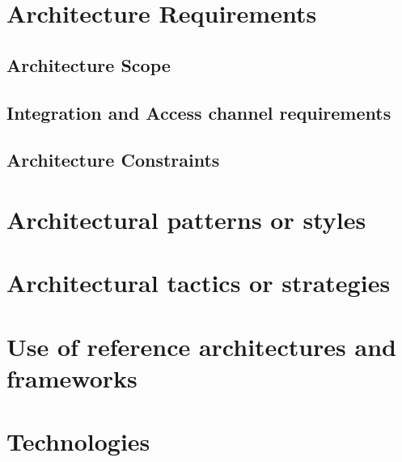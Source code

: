 \documentclass[12pt]{article}
\begin{document}


\newpage
\tableofcontents

\newpage

\section{Architecture Requirements}
	\subsection{Architecture Scope}

\newpage


\newpage
	\subsection{Integration and Access channel requirements}

\newpage
	\subsection{Architecture Constraints}

\newpage

\section{Architectural patterns or styles}

\newpage

\section{Architectural tactics or strategies}

\newpage

\section{Use of reference architectures and frameworks}

\newpage

\section{Technologies}

\newpage

\newpage
\end{document}
